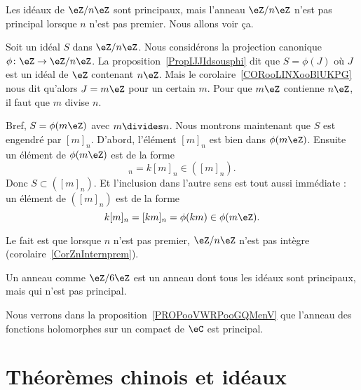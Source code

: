 \begin{example}       \label{EXooCJRPooYkWdyr}

	Les idéaux de \( \eZ/n\eZ\) sont principaux, mais l'anneau \( \eZ/n\eZ\) n'est pas principal lorsque \( n\) n'est pas premier. Nous allons voir ça.

	\begin{subproof}
		Soit un idéal \( S\) dans \( \eZ/n\eZ\). Nous considérons la projection canonique \( \phi\colon \eZ\to \eZ/n\eZ\). La proposition~\ref{PropIJJIdsousphi} dit que  \( S=\phi(J)\) où \( J\) est un idéal de \( \eZ\) contenant \( n\eZ\). Mais le corolaire~\ref{CORooLINXooBlUKPG} nous dit qu'alors \( J=m\eZ\) pour un certain \( m\). Pour que \( m\eZ\) contienne \( n\eZ\), il faut que \( m\) divise \( n\).

		Bref, \( S=\phi(m\eZ)\) avec \( m\divides n\). Nous montrons maintenant que \( S\) est engendré par \( [m]_n\). D'abord, l'élément \( [m]_n\) est bien dans \( \phi(m\eZ)\). Ensuite un élément de \( \phi(m\eZ)\) est de la forme
		\begin{equation}
			[km]_n=k[m]_n\in ([m]_n).
		\end{equation}
		Donc \( S\subset ([m]_n)\). Et l'inclusion dans l'autre sens est tout aussi immédiate : un élément de \( ([m]_n)\) est de la forme
		\begin{equation}
			k[m]_n=[km]_n=\phi(km)\in \phi(m\eZ).
		\end{equation}

		Le fait est que lorsque \( n\) n'est pas premier, \( \eZ/n\eZ\) n'est pas intègre (corolaire~\ref{CorZnInternprem}).

		\spitem[Moralité]
		Un anneau comme \( \eZ/6\eZ\) est un anneau dont tous les idéaux sont principaux, mais qui n'est pas principal.
	\end{subproof}
\end{example}

\begin{example}
	Nous verrons dans la proposition~\ref{PROPooVWRPooGQMenV} que l'anneau des fonctions holomorphes sur un compact de \( \eC\) est principal.
\end{example}

\section{Théorèmes chinois et idéaux}


